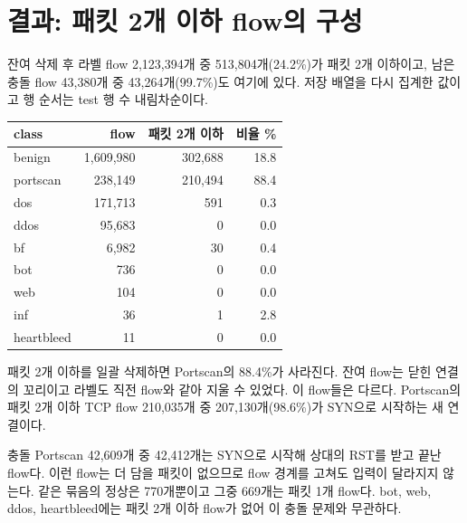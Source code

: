 \section{결과: 패킷 2개 이하 flow의 구성}
잔여 삭제 후 라벨 flow 2,123,394개 중 513,804개(24.2\%)가 패킷 2개 이하이고, 남은 충돌 flow 43,380개 중 43,264개(99.7\%)도 여기에 있다. 저장 배열을 다시 집계한 값이고 행 순서는 test 행 수 내림차순이다.
\begin{center}\small
\begin{tabular}{lrrr}
\toprule
class & flow & 패킷 2개 이하 & 비율 \%\\\midrule
benign & 1,609,980 & 302,688 & 18.8\\
portscan & 238,149 & 210,494 & 88.4\\
dos & 171,713 & 591 & 0.3\\
ddos & 95,683 & 0 & 0.0\\
bf & 6,982 & 30 & 0.4\\
bot & 736 & 0 & 0.0\\
web & 104 & 0 & 0.0\\
inf & 36 & 1 & 2.8\\
heartbleed & 11 & 0 & 0.0\\
\bottomrule
\end{tabular}
\end{center}
패킷 2개 이하를 일괄 삭제하면 Portscan의 88.4\%가 사라진다. 잔여 flow는 닫힌 연결의 꼬리이고 라벨도 직전 flow와 같아 지울 수 있었다. 이 flow들은 다르다. Portscan의 패킷 2개 이하 TCP flow 210,035개 중 207,130개(98.6\%)가 SYN으로 시작하는 새 연결이다.

충돌 Portscan 42,609개 중 42,412개는 SYN으로 시작해 상대의 RST를 받고 끝난 flow다. 이런 flow는 더 담을 패킷이 없으므로 flow 경계를 고쳐도 입력이 달라지지 않는다. 같은 묶음의 정상은 770개뿐이고 그중 669개는 패킷 1개 flow다. bot, web, ddos, heartbleed에는 패킷 2개 이하 flow가 없어 이 충돌 문제와 무관하다.


